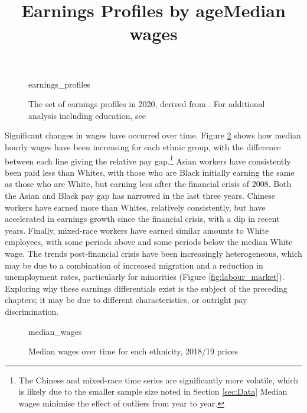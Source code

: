 \documentclass[class=article, crop=false]{standalone}
\begin{document}
\begin{figure}[h]
\centering
    \title{Earnings Profiles by age}
    {earnings_profiles}
    \caption{The set of earnings profiles in 2020, derived from \citet{ONSc}. For additional analysis including education, see \citet{Mincer}}
    \label{fig:earnings_profiles}
    \vspace{-10pt}
\end{figure}

Significant changes in wages have occurred over time. Figure \ref{fig:median_wages} shows how median hourly wages have been increasing for each ethnic group, with the difference between each line giving the relative pay gap.\footnote{The Chinese and mixed-race time series are significantly more volatile, which is likely due to the smaller sample size noted in Section \ref{sec:Data} Median wages minimise the effect of outliers from year to year.} Asian workers have consistently been paid less than Whites, with those who are Black initially earning the same as those who are White, but earning less after the financial crisis of 2008. Both the Asian and Black pay gap has narrowed in the last three years. Chinese workers have earned more than Whites, relatively consistently, but have accelerated in earnings growth since the financial crisis, with a dip in recent years. Finally, mixed-race workers have earned similar amounts to White employees, with some periods above and some periods below the median White wage. The trends post-financial crisis have been increasingly heterogeneous, which may be due to a combination of increased migration \citep{ONSj} and a reduction in unemployment rates, particularly for minorities (Figure \ref{fig:labour_market}). Exploring why these earnings differentials exist is the subject of the preceding chapters; it may be due to different characteristics, or outright pay discrimination.

\begin{figure}[]
\centering
    \title{Median wages}
    {median_wages}
    \caption{Median wages over time for each ethnicity, 2018/19 prices}
    \label{fig:median_wages}
\end{figure}

\end{document}
